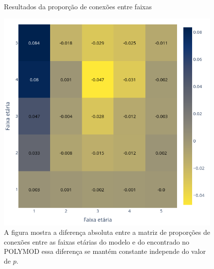 \begin{figure}[H]
    \centering
    
    \captionsetup{font=normalsize,skip=0.8pt,singlelinecheck=on,labelsep=endash}
    \caption{Resultados da proporção de conexões entre faixas}
    \includegraphics[scale= 0.4]{figuras/modelo.png}
    \captionsetup{font=small,justification=justified}
    \caption*{ A figura mostra a diferença absoluta entre a matriz de proporções de conexões entre as faixas etárias do modelo e do encontrado no POLYMOD essa diferença se mantém constante independe do valor de $p$.}
    \label{fig:modelo}
\end{figure}


